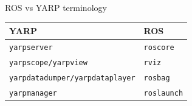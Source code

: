 \documentclass[compress]{beamer}
\begin{document}
\begin{frame}{ROS vs YARP terminology}
    \begin{table}[]
        \begin{tabularx}{\linewidth}{l>{\raggedright}X}
            \toprule
            \textbf{YARP}			& \textbf{ROS} \tabularnewline
            \midrule
            \texttt{yarpserver}		& \texttt{roscore} \tabularnewline
            \texttt{yarpscope/yarpview}		& \texttt{rviz} \tabularnewline
            \texttt{yarpdatadumper/yarpdataplayer}		& \texttt{rosbag} \tabularnewline
            \texttt{yarpmanager}		& \texttt{roslaunch} \tabularnewline
            \bottomrule
        \end{tabularx}
        \label{tab:options}
    \end{table}

\end{frame}

\end{document}
